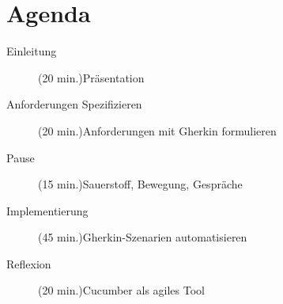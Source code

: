 \documentclass{article}
\begin{document}
\section*{Agenda}
	\begin{description}
		\item[Einleitung] (20 min.)\newline Präsentation
		\item[Anforderungen Spezifizieren] (20 min.)\newline Anforderungen mit Gherkin formulieren
		\item[Pause] (15 min.)\newline Sauerstoff, Bewegung, Gespräche
		\item[Implementierung] (45 min.)\newline Gherkin-Szenarien automatisieren 
		\item[Reflexion] (20 min.)\newline Cucumber als agiles Tool
	\end{description}
\end{document}
